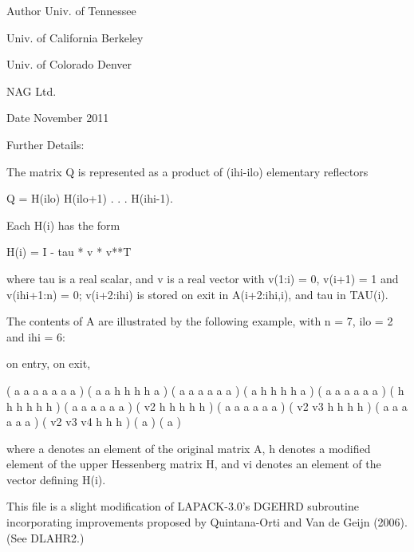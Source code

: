 \begin{DoxyAuthor}{Author}
Univ. of Tennessee 

Univ. of California Berkeley 

Univ. of Colorado Denver 

N\+A\+G Ltd. 
\end{DoxyAuthor}
\begin{DoxyDate}{Date}
November 2011 
\end{DoxyDate}
\begin{DoxyParagraph}{Further Details\+: }
\begin{DoxyVerb}  The matrix Q is represented as a product of (ihi-ilo) elementary
  reflectors

     Q = H(ilo) H(ilo+1) . . . H(ihi-1).

  Each H(i) has the form

     H(i) = I - tau * v * v**T

  where tau is a real scalar, and v is a real vector with
  v(1:i) = 0, v(i+1) = 1 and v(ihi+1:n) = 0; v(i+2:ihi) is stored on
  exit in A(i+2:ihi,i), and tau in TAU(i).

  The contents of A are illustrated by the following example, with
  n = 7, ilo = 2 and ihi = 6:

  on entry,                        on exit,

  ( a   a   a   a   a   a   a )    (  a   a   h   h   h   h   a )
  (     a   a   a   a   a   a )    (      a   h   h   h   h   a )
  (     a   a   a   a   a   a )    (      h   h   h   h   h   h )
  (     a   a   a   a   a   a )    (      v2  h   h   h   h   h )
  (     a   a   a   a   a   a )    (      v2  v3  h   h   h   h )
  (     a   a   a   a   a   a )    (      v2  v3  v4  h   h   h )
  (                         a )    (                          a )

  where a denotes an element of the original matrix A, h denotes a
  modified element of the upper Hessenberg matrix H, and vi denotes an
  element of the vector defining H(i).

  This file is a slight modification of LAPACK-3.0's DGEHRD
  subroutine incorporating improvements proposed by Quintana-Orti and
  Van de Geijn (2006). (See DLAHR2.)\end{DoxyVerb}
 
\end{DoxyParagraph}
\hypertarget{group__doubleGEcomputational_ga2f10ebf79772a5399be9ed6169c9d975}{}
